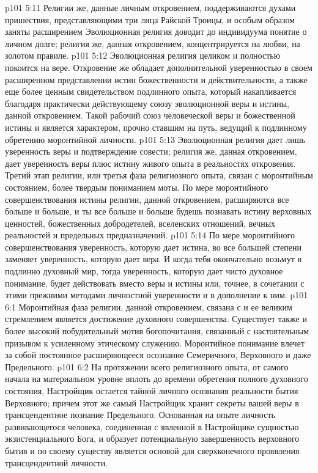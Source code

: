\vs p101 5:11 Религии же, данные личным откровением, поддерживаются духами пришествия, представляющими три лица Райской Троицы, и особым образом заняты расширением  Эволюционная религия доводит до индивидуума понятие о личном долге; религия же, данная откровением, концентрируется на любви, на золотом правиле.
\vs p101 5:12 Эволюционная религия целиком и полностью покоится на вере. Откровение же обладает дополнительной уверенностью в своем расширенном представлении истин божественности и действительности, а также еще более ценным свидетельством подлинного опыта, который накапливается благодаря практически действующему союзу эволюционной веры и истины, данной откровением. Такой рабочий союз человеческой веры и божественной истины и является характером, прочно ставшим на путь, ведущий к подлинному обретению моронтийной личности.
\vs p101 5:13 \pc Эволюционная религия дает лишь уверенность веры и подтверждение совести; религия же, данная откровением, дает уверенность веры плюс истину живого опыта в реальностях откровения. Третий этап религии, или третья фаза религиозного опыта, связан с моронтийным состоянием, более твердым пониманием моты. По мере моронтийного совершенствования истины религии, данной откровением, расширяются все больше и больше, и ты все больше и больше будешь познавать истину верховных ценностей, божественных добродетелей, вселенских отношений, вечных реальностей и предельных предназначений.
\vs p101 5:14 По мере моронтийного совершенствования уверенность, которую дает истина, во все большей степени заменяет уверенность, которую дает вера. И когда тебя окончательно возьмут в подлинно духовный мир, тогда уверенность, которую дает чисто духовное понимание, будет действовать вместо веры и истины или, точнее, в сочетании с этими прежними методами личностной уверенности и в дополнение к ним.
\vs p101 6:1 Моронтийная фаза религии, данной откровением, связана с  и ее великим стремлением является достижение духовного совершенства. Существует также и более высокий побудительный мотив богопочитания, связанный с настоятельным призывом к усиленному этическому служению. Моронтийное понимание влечет за собой постоянное расширяющееся осознание Семеричного, Верховного и даже Предельного.
\vs p101 6:2 На протяжении всего религиозного опыта, от самого начала на материальном уровне вплоть до времени обретения полного духовного состояния, Настройщик остается тайной личного осознания реальности бытия Верховного; причем этот же самый Настройщик хранит секреты вашей веры в трансцендентное познание Предельного. Основанная на опыте личность развивающегося человека, соединенная с явленной в Настройщике сущностью экзистенциального Бога, и образует потенциальную завершенность верховного бытия и по своему существу является основой для сверхконечного проявления трансцендентной личности.

